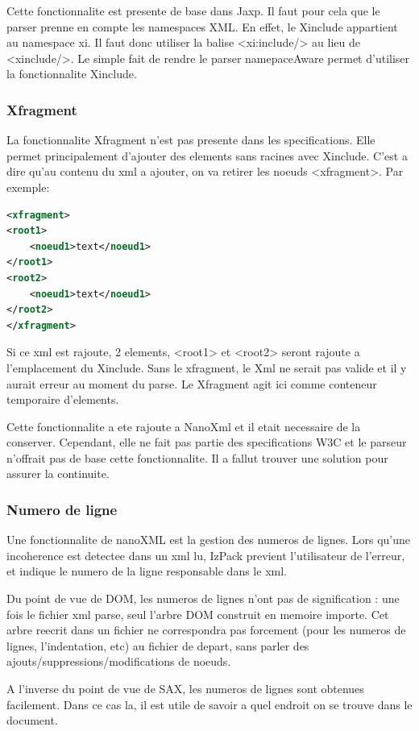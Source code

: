 Cette fonctionnalite est presente de base dans Jaxp. Il faut pour cela que le parser prenne en compte les namespaces XML. En effet, le Xinclude appartient au namespace xi. Il faut donc utiliser la balise <xi:include/> au lieu de <xinclude/>. Le simple fait de rendre le parser namepaceAware permet d'utiliser la fonctionnalite Xinclude. 

\subsubsection{Xfragment}
La fonctionnalite Xfragment n'est pas presente dans les specifications. Elle permet principalement d'ajouter des elements sans racines avec Xinclude. C'est a dire qu'au contenu du xml a ajouter, on va retirer les noeuds <xfragment>. Par exemple: 
\begin{lstlisting}[language=xml]
<xfragment>
<root1>
	<noeud1>text</noeud1>
</root1>
<root2>
	<noeud1>text</noeud1>
</root2>
</xfragment>
\end{lstlisting}
Si ce xml est rajoute, 2 elements, <root1> et <root2> seront rajoute a l'emplacement du Xinclude. Sans le xfragment, le Xml ne serait pas valide et il y aurait erreur au moment du parse. Le Xfragment agit ici comme conteneur temporaire d'elements.

Cette fonctionnalite a ete rajoute a NanoXml et il etait necessaire de la conserver. Cependant, elle ne fait pas partie des specifications W3C et le parseur n'offrait pas de base cette fonctionnalite. Il a fallut trouver une solution pour assurer la continuite.
\subsubsection{Numero de ligne}
Une fonctionnalite de nanoXML est la gestion des numeros de lignes. Lors qu'une incoherence est detectee dans un xml lu, IzPack previent l'utilisateur de l'erreur, et indique le numero de la ligne responsable dans le xml.

Du point de vue de DOM, les numeros de lignes n'ont pas de signification : une fois le fichier xml parse, seul l'arbre DOM construit en memoire importe. Cet arbre reecrit dans un fichier ne correspondra pas forcement (pour les numeros de lignes, l'indentation, etc) au fichier de depart, sans parler des ajouts/suppressions/modifications de noeuds.

A l'inverse du point de vue de SAX, les numeros de lignes sont obtenues facilement. Dans ce cas la, il est utile de savoir a quel endroit on se trouve dans le document.

